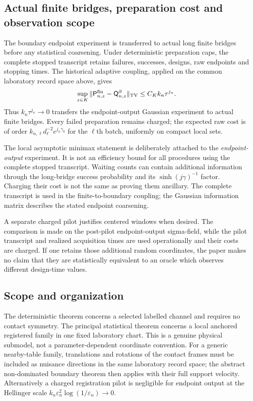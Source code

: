 \subsection{Actual finite bridges, preparation cost and observation scope}

The boundary endpoint experiment is transferred to actual long finite
bridges before any statistical coarsening.  Under deterministic preparation
caps, the complete stopped transcript retains failures, successes, designs,
raw endpoints and stopping times.  The historical adaptive coupling, applied
on the common laboratory record space above, gives
\begin{equation}\label{eq:intro-v21-stopped-transfer}
 \sup_{z\in K}
 \|\mathsf P_{n,z}^{\rm fin}-\mathsf Q_{n,z}^{\partial}\|_{\rm TV}
 \le C_Kk_n\tau^{j_n}.
\end{equation}
Thus $k_n\tau^{j_n}\to0$ transfers the endpoint-output Gaussian experiment to
actual finite bridges.  Every failed preparation remains charged; the
expected raw cost is of order
$k_{n,\ell}d_\ell^{-2}e^{j_n\gamma_0}$ for the $\ell$th batch, uniformly on
compact local sets.

The local asymptotic minimax statement is deliberately attached to the
\emph{endpoint-output} experiment.  It is not an efficiency bound for all
procedures using the complete stopped transcript.  Waiting counts can contain
additional information through the long-bridge success probability and its
$\sinh(j\gamma)^{-1}$ factor.  Charging their cost is not the same as proving
them ancillary.  The complete transcript is used in the finite-to-boundary
coupling; the Gaussian information matrix describes the stated endpoint
coarsening.

A separate charged pilot justifies centered windows when desired.  The
comparison is made on the post-pilot endpoint-output sigma-field, while the
pilot transcript and realized acquisition times are used operationally and
their costs are charged.  If one retains those additional random coordinates,
the paper makes no claim that they are statistically equivalent to an oracle
which observes different design-time values.

\subsection{Scope and organization}

The deterministic theorem concerns a selected labelled channel and requires
no contact symmetry.  The principal statistical theorem concerns a local
anchored registered family in one fixed laboratory chart.  This is a genuine
physical submodel, not a parameter-dependent coordinate convention.  For a
generic nearby-table family, translations and rotations of the contact frames
must be included as nuisance directions in the same laboratory record space;
the abstract non-dominated boundary theorem then applies with their full
support velocity.  Alternatively a charged registration pilot is negligible
for endpoint output at the Hellinger scale
$k_n\varepsilon_n^2\log(1/\varepsilon_n)\to0$.

